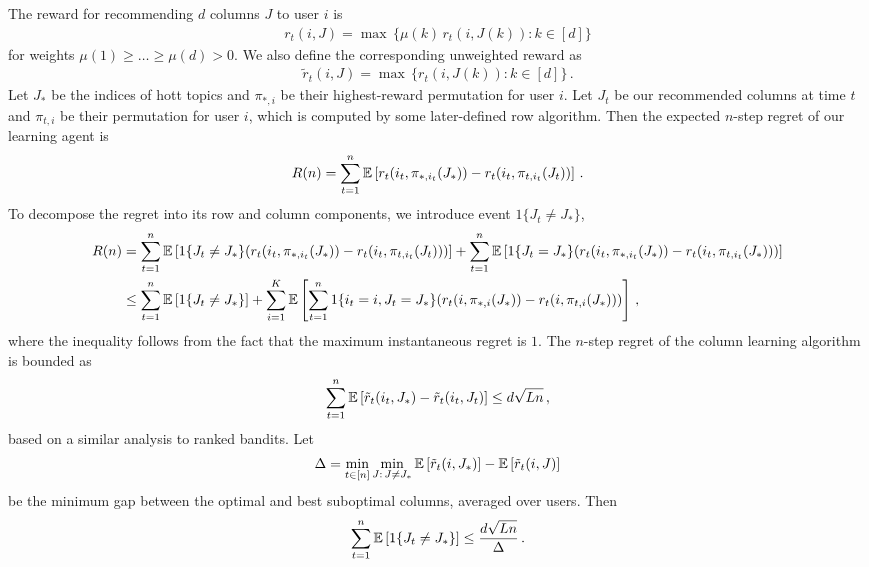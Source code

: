 The reward for recommending $d$ columns $J$ to user $i$ is
\begin{align*}
  r_t(i, J) =
  \max \, \{\mu(k) \, r_t(i, J(k)): k \in [d]\}
\end{align*}
for weights $\mu(1) \geq \dots \geq \mu(d) > 0$. We also define the corresponding unweighted reward as
\begin{align*}
  \tilde{r}_t(i, J) =
  \max \, \{r_t(i, J(k)): k \in [d]\}\,.
\end{align*}
Let $J_\ast$ be the indices of hott topics and $\pi_{\ast, i}$ be their highest-reward permutation for user $i$. Let $J_t$ be our recommended columns at time $t$ and $\pi_{t, i}$ be their permutation for user $i$, which is computed by some later-defined row algorithm. Then the expected $n$-step regret of our learning agent is
\begin{align*}
  R(n) =
  \sum_{t = 1}^n \mathbb{E}\left[r_t(i_t, \pi_{\ast, i_t}(J_\ast)) - r_t(i_t, \pi_{t, i_t}(J_t))\right]\,.
\end{align*}
To decompose the regret into its row and column components, we introduce event $1\{J_t \neq J_\ast\}$,
\begin{align*}
  R(n)
  & = \sum_{t = 1}^n \mathbb{E}\left[1\{J_t \neq J_\ast\} (r_t(i_t, \pi_{\ast, i_t}(J_\ast)) - r_t(i_t, \pi_{t, i_t}(J_t)))\right] +
  \sum_{t = 1}^n \mathbb{E}\left[1\{J_t = J_\ast\} (r_t(i_t, \pi_{\ast, i_t}(J_\ast)) - r_t(i_t, \pi_{t, i_t}(J_\ast)))\right] \\
  & \leq \sum_{t = 1}^n \mathbb{E}\left[1\{J_t \neq J_\ast\}\right] +
  \sum_{i = 1}^K \mathbb{E}\left[\sum_{t = 1}^n 1\{i_t = i, J_t = J_\ast\} (r_t(i, \pi_{\ast, i}(J_\ast)) - r_t(i, \pi_{t, i}(J_\ast)))\right]\,,
\end{align*}
where the inequality follows from the fact that the maximum instantaneous regret is $1$. The $n$-step regret of the column learning algorithm is bounded as
\begin{align*}
  \sum_{t = 1}^n \mathbb{E}\left[\tilde{r}_t(i_t, J_\ast) - \tilde{r}_t(i_t, J_t)\right] \leq
  d \sqrt{L n}\,,
\end{align*}
based on a similar analysis to ranked bandits. Let
\begin{align*}
  \Delta =
  \min_{t \in [n]} \min_{J:\, J \neq J_\ast} \mathbb{E}\left[\tilde{r}_t(i, J_\ast)\right] - \mathbb{E}\left[\tilde{r}_t(i, J)\right]
\end{align*}
be the minimum gap between the optimal and best suboptimal columns, averaged over users. Then
\begin{align*}
  \sum_{t = 1}^n \mathbb{E}\left[1\{J_t \neq J_\ast\}\right] \leq
  \frac{d \sqrt{L n}}{\Delta}\,.
\end{align*}
